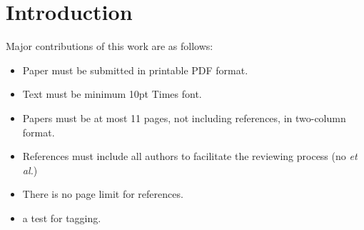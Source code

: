 \section{Introduction}

\vspace{1ex}Major contributions of this work are as follows:

\begin{itemize}
\item Paper must be submitted in printable PDF format.
\item Text must be minimum 10pt Times font.
\item Papers must be at most 11 pages, not including references, in two-column format.
\item References must include all authors to facilitate the reviewing process (no \emph{et al.})
\item There is no page limit for references.
\item a test for tagging.
\end{itemize}



